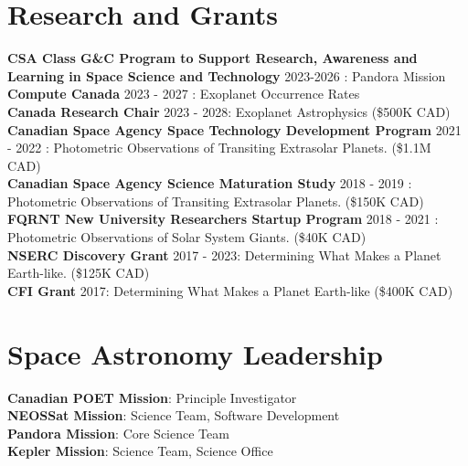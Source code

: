 \documentclass[margin,line]{res}
\begin{document}
\begin{resume}
\section{\sc Research and Grants}
{\bf CSA Class G\&C Program to Support Research, Awareness and Learning in Space Science and Technology} 2023-2026 : Pandora Mission\\
{\bf Compute Canada} 2023 - 2027 : Exoplanet Occurrence Rates \\
{\bf Canada Research Chair} 2023 - 2028: Exoplanet Astrophysics (\$500K CAD)\\
{\bf Canadian Space Agency Space Technology Development Program} 2021 - 2022 : Photometric Observations of Transiting Extrasolar Planets. (\$1.1M CAD) \\
{\bf Canadian Space Agency Science Maturation Study} 2018 - 2019 : Photometric Observations of Transiting Extrasolar Planets. (\$150K CAD) \\
{\bf FQRNT New University Researchers Startup Program}  2018 - 2021 : Photometric Observations of Solar System Giants. (\$40K CAD) \\
{\bf NSERC Discovery Grant}  2017 - 2023: Determining What Makes a Planet Earth-like. (\$125K CAD)\\
{\bf CFI Grant} 2017: Determining What Makes a Planet Earth-like (\$400K CAD)\\

\vspace*{-.2in}

\section{\sc Space Astronomy Leadership}
{\bf Canadian POET Mission}: Principle Investigator \\
{\bf NEOSSat Mission}: Science Team, Software Development \\
{\bf Pandora Mission}: Core Science Team \\
{\bf Kepler Mission}: Science Team, Science Office


\end{resume}
\end{document}
